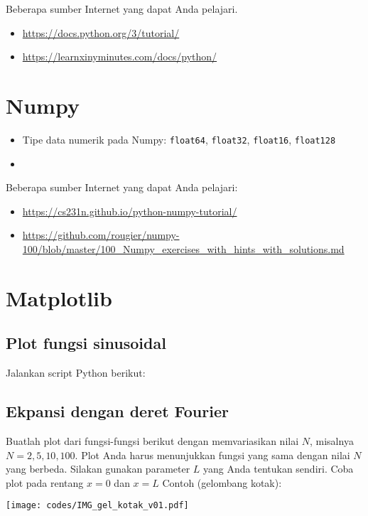 \documentclass[a4paper,11pt,bahasa]{article} %
\newcommand{\txtinline}[1]{\texttt{#1}}
\begin{document}
Beberapa sumber Internet yang dapat Anda pelajari.
\begin{itemize}
\item {\footnotesize \url{https://docs.python.org/3/tutorial/}}
\item {\footnotesize \url{https://learnxinyminutes.com/docs/python/}}
\end{itemize}


\section{Numpy}

\begin{itemize}
\item Tipe data numerik pada Numpy: \txtinline{float64}, \txtinline{float32},
\txtinline{float16}, \txtinline{float128}
\item 
\end{itemize}


Beberapa sumber Internet yang dapat Anda pelajari:
\begin{itemize}
\item {\footnotesize \url{https://cs231n.github.io/python-numpy-tutorial/}}
\item {\footnotesize \url{https://github.com/rougier/numpy-100/blob/master/100_Numpy_exercises_with_hints_with_solutions.md}}
\end{itemize}

\section{Matplotlib}


\subsection{Plot fungsi sinusoidal}

Jalankan script Python berikut:

\subsection{Ekpansi dengan deret Fourier}

Buatlah plot dari fungsi-fungsi berikut dengan memvariasikan nilai $N$, misalnya
$N = 2, 5, 10, 100$. Plot Anda harus menunjukkan fungsi yang sama dengan nilai $N$
yang berbeda.
Silakan gunakan parameter $L$ yang Anda tentukan sendiri. Coba plot pada rentang
$x=0$ dan $x=L$
Contoh (gelombang kotak):
{\center
\texttt{[image: codes/IMG\_gel\_kotak\_v01.pdf]}
\par}
\end{document}
